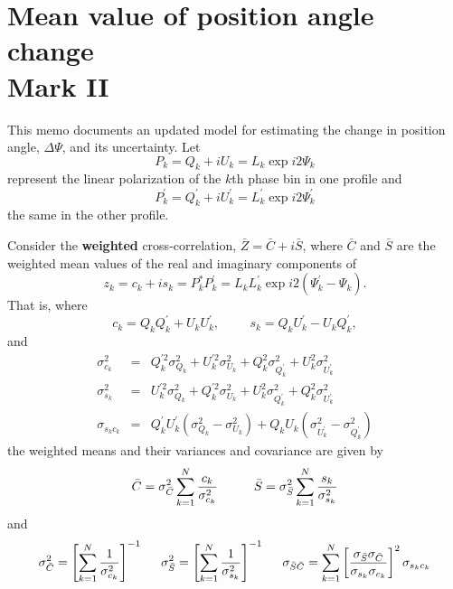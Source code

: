 \documentclass[12pt]{article}
\begin{document}
\section{Mean value of position angle change \\ Mark II}

This memo documents an updated model for estimating the change in
position angle, $\Delta\Psi$, and its uncertainty. Let
\begin{equation}
P_k = Q_k + i U_k = L_k \exp i2\Psi_k
\end{equation}
represent the linear polarization of the $k$th phase bin in one profile and
\begin{equation}
P^\prime_k = Q^\prime_k + i U^\prime_k = L^\prime_k \exp i2\Psi^\prime_k
\end{equation}
the same in the other profile.  

Consider the {\bf weighted} cross-correlation,
$\bar{Z}=\bar{C}+i\bar{S}$, where $\bar C$ and $\bar S$ are the
weighted mean values of the real and imaginary components of
\begin{equation}
z_k = c_k + i s_k 
    = P^*_k P^\prime_k = L_k L^\prime_k \exp i2(\Psi^\prime_k - \Psi_k).
\end{equation}
That is, where
\begin{equation}
c_k = Q_kQ^\prime_k + U_kU^\prime_k,
\hspace{1cm}
s_k = Q_kU^\prime_k - U_kQ^\prime_k,
\end{equation}
and
\begin{eqnarray}
\sigma_{c_k}^2 & = &
 Q^{\prime2}_k\sigma_{Q_k}^2 + U^{\prime2}_k\sigma_{U_k}^2 +
 Q^2_k\sigma_{Q^\prime_k}^2 + U^2_k\sigma_{U^\prime_k}^2 \\
\sigma_{s_k}^2 & = &
 U^{\prime2}_k\sigma_{Q_k}^2 + Q^{\prime2}_k\sigma_{U_k}^2 +
 U^2_k\sigma_{Q^\prime_k}^2 + Q^2_k\sigma_{U^\prime_k}^2 \\
\sigma_{s_k c_k} & = &
 Q^\prime_k U^\prime_k (\sigma_{Q_k}^2 - \sigma_{U_k}^2) +
 Q_kU_k (\sigma_{U^\prime_k}^2 -\sigma_{Q^\prime_k}^2)
\end{eqnarray}
the weighted means and their variances and covariance are given by
\begin{equation}
\bar C = \sigma_{\bar C}^2 \sum_{k=1}^N { c_k \over \sigma_{c_k}^2 }
\hspace{1cm}
\bar S = \sigma_{\bar S}^2 \sum_{k=1}^N { s_k \over \sigma_{s_k}^2 }
\end{equation}
and
\begin{equation}
\sigma_{\bar C}^2 = \left[ \sum_{k=1}^N{1\over\sigma_{c_k}^2} \right]^{-1}
\hspace{5mm}
\sigma_{\bar S}^2 = \left[ \sum_{k=1}^N{1\over\sigma_{s_k}^2} \right]^{-1}
\hspace{5mm}
\sigma_{\bar S \bar C} = \sum_{k=1}^N
\left[\sigma_{\bar S}\sigma_{\bar C}\over\sigma_{s_k}\sigma_{c_k}\right]^2
                         \sigma_{s_k c_k}
\end{equation}
\end{document}
